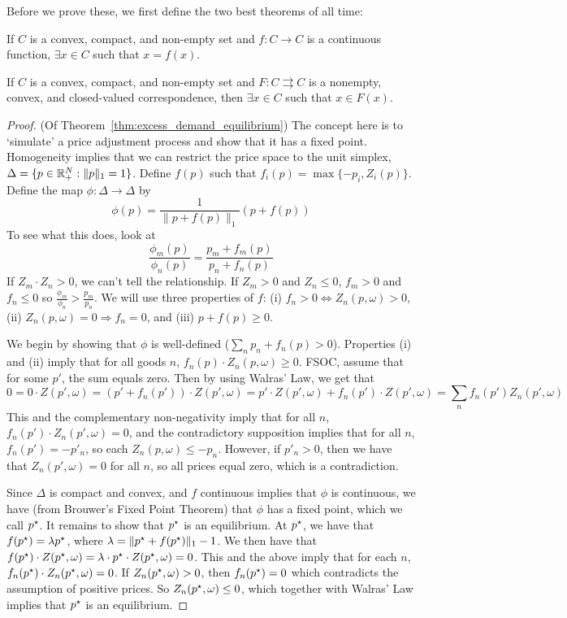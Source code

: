 \documentclass[10pt]{article}
\begin{document}
Before we prove these, we first define the two best theorems of all time:

\begin{theorem}
	 If $C$ is a convex, compact, and non-empty set and $f: C \to C$ is a continuous function, $\exists x \in C$ such that $x = f(x)$.
\end{theorem}
\begin{theorem}
	 If $C$ is a convex, compact, and non-empty set and $F: C \rightrightarrows C$ is a nonempty, convex, and closed-valued correspondence, then $\exists x \in C$ such that $x \in F(x)$.
\end{theorem}

\begin{proof}
	(Of Theorem~\ref{thm:excess_demand_equilibrium}) The concept here is to `simulate' a price adjustment process and show that it has a fixed point. Homogeneity implies that we can restrict the price space to the unit simplex, $\Delta = \{p \in \mathbb{R}^N_+ : \|p\|_1 = 1\}$. Define $f(p)$ such that $f_i(p) = \max\{-p_i,Z_i(p)\}$. Define the map $\phi: \Delta \to \Delta$ by\[\phi(p) = \frac{1}{\|p + f(p)\|_1} (p + f(p))\]To see what this does, look at \[\frac{\phi_m(p)}{\phi_n(p)} = \frac{p_m + f_m(p)}{p_n + f_n(p)}\]If $Z_m \cdot Z_n > 0$, we can't tell the relationship. If $Z_m > 0$ and $Z_n \le 0$, $f_m > 0$ and $f_n \le 0$ so $\frac{\phi_m}{\phi_n} > \frac{p_m}{p_n}$. We will use three properties of $f$: (i) $f_n > 0 \Longleftrightarrow Z_n(p,\omega) > 0$, (ii) $Z_n(p,\omega) = 0 \Longrightarrow f_n = 0$, and (iii) $p + f(p) \ge 0$.
	
	We begin by showing that $\phi$ is well-defined (\ie $\sum_n p_n + f_n(p) > 0$). Properties (i) and (ii) imply that for all goods $n$, $f_n(p)\cdot Z_n(p,\omega) \ge 0$. FSOC, assume that for some $p'$, the sum equals zero. Then by using Walras' Law, we get that \[0 = 0 \cdot Z(p',\omega) = (p' + f_n(p')) \cdot Z(p',\omega) = p'\cdot Z(p',\omega) + f_n(p') \cdot Z(p',\omega) = \sum_nf_n(p')Z_n(p',\omega)\]This and the complementary non-negativity imply that for all $n$, $f_n(p') \cdot Z_n(p',\omega) = 0$, and the contradictory supposition implies that for all $n$, $f_n(p') = -p'_n$, so each $Z_n(p,\omega) \le -p_n$. However, if $p'_n > 0$, then we have that $Z_n(p',\omega) = 0$ for all $n$, so all prices equal zero, which is a contradiction.
	
	Since $\Delta$ is compact and convex, and $f$ continuous implies that $\phi$ is continuous, we have (from Brouwer's Fixed Point Theorem) that $\phi$ has a fixed point, which we call $p^\star$. It remains to show that $p^\star$ is an equilibrium. At $p^\star$, we have that $f(p^\star) = \lambda p^\star$, where $\lambda = \|p^\star + f(p^\star)\|_1-1$. We then have that $f(p^\star) \cdot Z(p^\star,\omega) = \lambda \cdot p^\star \cdot Z(p^\star,\omega) = 0$. This and the above imply that for each $n$, $f_n(p^\star) \cdot Z_n(p^\star,\omega) = 0$. If $Z_n(p^\star,\omega) > 0$, then $f_n(p^\star) = 0$ which contradicts the assumption of positive prices. So $Z_n(p^\star,\omega) \le 0$, which together with Walras' Law implies that $p^\star$ is an equilibrium.
\end{proof}
\end{document}
